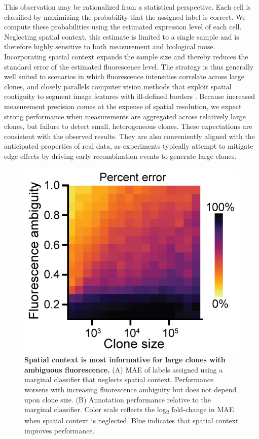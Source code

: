 This observation may be rationalized from a statistical perspective. Each cell is classified by maximizing the probability that the assigned label is correct. We compute these probabilities using the estimated expression level of each cell. Neglecting spatial context, this estimate is limited to a single sample and is therefore highly sensitive to both measurement and biological noise. Incorporating spatial context expands the sample size and thereby reduces the standard error of the estimated fluorescence level. The strategy is thus generally well suited to scenarios in which fluorescence intensities correlate across large clones, and closely parallels computer vision methods that exploit spatial contiguity to segment image features with ill-defined borders \cite{Nguyen2012}. Because increased measurement precision comes at the expense of spatial resolution, we expect strong performance when measurements are aggregated across relatively large clones, but failure to detect small, heterogeneous clones. These expectations are consistent with the observed results. They are also conveniently aligned with the anticipated properties of real data, as experiments typically attempt to mitigate edge effects by driving early recombination events to generate large clones.

\begin{figure}[h]
\includegraphics[scale=1]{./figure_S8}
\caption[Spatial context is most informative for large and ambiguous clones.]{\textbf{Spatial context is most informative for large clones with ambiguous fluorescence.}
(A) MAE of labels assigned using a marginal classifier that neglects spatial context. Performance worsens with increasing fluorescence ambiguity but does not depend upon clone size. (B) Annotation performance relative to the marginal classifier. Color scale reflects the log\textsubscript{2} fold-change in MAE when spatial context is neglected. Blue indicates that spatial context improves performance.}
\label{fig:figS8}
\end{figure}


